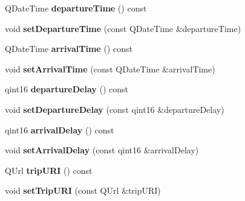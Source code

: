 \begin{DoxyCompactItemize}
\item 
\mbox{\label{classFragments_1_1Fragment_adfcf2bb9a548f41f4ca88ad117c655a3}} 
Q\+Date\+Time {\bfseries departure\+Time} () const
\item 
\mbox{\label{classFragments_1_1Fragment_a595b2c52c5cbaab0a97ceda63028d91d}} 
void {\bfseries set\+Departure\+Time} (const Q\+Date\+Time \&departure\+Time)
\item 
\mbox{\label{classFragments_1_1Fragment_aa7e96d4d8b9e36c19d3f6134ff3072e9}} 
Q\+Date\+Time {\bfseries arrival\+Time} () const
\item 
\mbox{\label{classFragments_1_1Fragment_a5b7ed13c7d4417f3b4f3d87aebd68a90}} 
void {\bfseries set\+Arrival\+Time} (const Q\+Date\+Time \&arrival\+Time)
\item 
\mbox{\label{classFragments_1_1Fragment_a8c8363f22d1aca339a66d342f9e5f0c8}} 
qint16 {\bfseries departure\+Delay} () const
\item 
\mbox{\label{classFragments_1_1Fragment_a3293b86baeee32223a5019594fb1ae82}} 
void {\bfseries set\+Departure\+Delay} (const qint16 \&departure\+Delay)
\item 
\mbox{\label{classFragments_1_1Fragment_aec60f571141b0c7aacbc172e83a4a2d3}} 
qint16 {\bfseries arrival\+Delay} () const
\item 
\mbox{\label{classFragments_1_1Fragment_ae5df59623d6835ec0224d58f9f3903db}} 
void {\bfseries set\+Arrival\+Delay} (const qint16 \&arrival\+Delay)
\item 
\mbox{\label{classFragments_1_1Fragment_aa3b1beb97e501bfa8ecb2127c2729803}} 
Q\+Url {\bfseries trip\+U\+RI} () const
\item 
\mbox{\label{classFragments_1_1Fragment_a47c214a918ce0fe7469b309cbecf01a1}} 
void {\bfseries set\+Trip\+U\+RI} (const Q\+Url \&trip\+U\+RI)
\item 

\end{DoxyCompactItemize}
